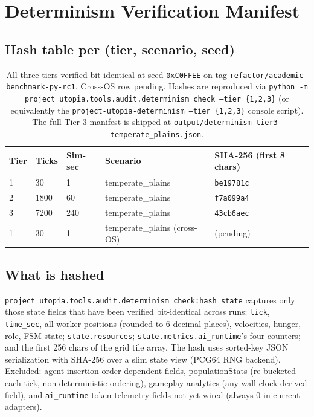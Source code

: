 \section{Determinism Verification Manifest}
\label{app:determinism-report}

\subsection{Hash table per (tier, scenario, seed)}

\begin{table}[h]
\centering
\small
\begin{tabular}{lllll}
\toprule
Tier & Ticks & Sim-sec & Scenario & SHA-256 (first 8 chars) \\
\midrule
1 & 30   & 1   & temperate\_plains & \texttt{be19781c} \\
2 & 1800 & 60  & temperate\_plains & \texttt{f7a099a4} \\
3 & 7200 & 240 & temperate\_plains & \texttt{43cb6aec} \\
1 & 30   & 1   & temperate\_plains (cross-OS) & (pending) \\
\bottomrule
\end{tabular}
\caption{All three tiers verified bit-identical at seed
\texttt{0xC0FFEE} on tag
\texttt{refactor/academic-benchmark-py-rc1}. Cross-OS row pending.
Hashes are reproduced via
\texttt{python -m project\_utopia.tools.audit.determinism\_check --tier \{1,2,3\}}
(or equivalently the
\texttt{project-utopia-determinism --tier \{1,2,3\}} console script).
The full Tier-3 manifest is shipped at
\texttt{output/determinism-tier3-temperate\_plains.json}.}
\end{table}

\subsection{What is hashed}

\texttt{project\_utopia.tools.audit.determinism\_check:hash\_state}
captures only those state fields that have been verified
bit-identical across runs:
\texttt{tick}, \texttt{time\_sec}, all worker positions (rounded to
6 decimal places), velocities, hunger, role, FSM state;
\texttt{state.resources}; \texttt{state.metrics.ai\_runtime}'s four
counters; and the first 256 chars of the grid tile array.
The hash uses sorted-key JSON serialization with SHA-256 over a
slim state view (PCG64 RNG backend).
Excluded: agent insertion-order-dependent fields, populationStats
(re-bucketed each tick, non-deterministic ordering), gameplay
analytics (any wall-clock-derived field), and
\texttt{ai\_runtime} token telemetry fields not yet wired
(always 0 in current adapters).

